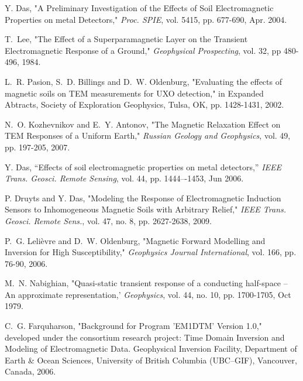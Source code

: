 \documentclass[onecolumn]{IEEEtran} %
\begin{document}
\begin{thebibliography}{100}
Y. Das, "A Preliminary Investigation of the Effects of Soil Electromagnetic Properties on metal Detectors," \emph{Proc. SPIE}, vol. 5415, pp. 677-690, Apr. 2004.

T.~Lee, "The Effect of a Superparamagnetic Layer on the Transient Electromagnetic Response of a Ground," \emph{Geophysical Prospecting}, vol. 32, pp 480-496, 1984.

L.~R. Pasion, S.~D. Billings and D.~W. Oldenburg, "Evaluating the effects of magnetic soils on TEM measurements for UXO detection," in {Expanded Abtracts}, Society of Exploration Geophysics, Tulsa, OK, pp. 1428-1431, 2002.

N.~O. Kozhevnikov and E.~Y. Antonov, "The Magnetic Relaxation Effect on TEM Responses of a Uniform Earth," \emph{Russian Geology and Geophysics}, vol. 49, pp. 197-205, 2007.

Y. Das, “Effects of soil electromagnetic properties on metal detectors,” \emph{IEEE Trans. Geosci. Remote Sensing}, vol. 44, pp. 1444–-1453, Jun 2006.

P. Druyts and Y. Das, "Modeling the Response of Electromagnetic Induction Sensors to Inhomogeneous Magnetic Soils with Arbitrary Relief," \emph{IEEE Trans. Geosci. Remote Sens.}, vol. 47, no. 8, pp. 2627-2638, 2009.

P.~G. Leli\`{e}vre and D.~W. Oldenburg, "Magnetic Forward Modelling and Inversion for High Susceptibility," \emph{Geophysics Journal International}, vol. 166, pp. 76-90, 2006.

M.~N. Nabighian, "Quasi-static transient response of a conducting half-space -- An approximate representation,' \emph{Geophysics}, vol. 44, no. 10, pp. 1700-1705, Oct 1979.

C.~G. Farquharson, "Background for Program 'EM1DTM' Version 1.0," developed under the consortium research project: Time Domain Inversion and Modeling of Electromagnetic Data. Geophysical Inversion Facility, Department of Earth \& Ocean Sciences, University of British Columbia (UBC–GIF), Vancouver, Canada, 2006. 



\end{thebibliography}
\end{document}
